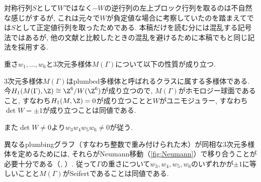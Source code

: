 \documentclass[11pt,b5paper,oneside,lualatex]{ltjsarticle} %
\numberwithin{equation}{section} %
\begin{document}
\begin{rem}
	対称行列$ S $として$ W $ではなく$ -W $の逆行列の左上ブロック行列を取るのは不自然な感じがするが, これは元々\cite{GPPV}で$ W $が負定値な場合に考察していたのを踏まえて\cite{MM}では$ S $として正定値行列を取ったためである. 
	本稿だけを読む分には混乱する記号法ではあるが, 他の文献と比較したときの混乱を避けるために本稿でも\cite{MM}と同じ記法を採用する. 
\end{rem}

重さ$ w_1, \dots, w_6 $と$ 3 $次元多様体$ M(\Gamma) $について以下の性質が成り立つ. 

\begin{rem}
	$ 3 $次元多様体$ M(\Gamma) $はplumbed多様体と呼ばれるクラスに属する多様体である. 
	今$ H_1(M(\Gamma), \Z) \cong \Z^6/W(\Z^6) $が成り立つので, $ M(\Gamma) $がホモロジー球面であること, すなわち$ H_1(M, \Z) = 0 $が成り立つことと$ W $がユニモジュラー, すなわち$ \det W = \pm 1 $が成り立つことは同値である. 
	
	また$ \det W \neq 0 $より$ w_3 w_4 w_5 w_6 \neq 0 $が従う. 
	
	異なるplumbingグラフ（すなわち整数で重み付けられた木）が同相な$ 3 $次元多様体を定めるためには, それらがNeumann移動（\cref{fig:Neumann}）で移り合うことが必要十分である（\cite[Proposition 2.2]{Neumann_Lecture}, \cite[Theorem 3.1]{Neumann_work}）.
	従って$ \Gamma $の重さについて$ w_3, w_4, w_5, w_6 $のいずれかが$ \pm 1 $に等しいことと$ M(\Gamma) $がSeifertであることは同値である. 
\end{rem}
\end{document}

